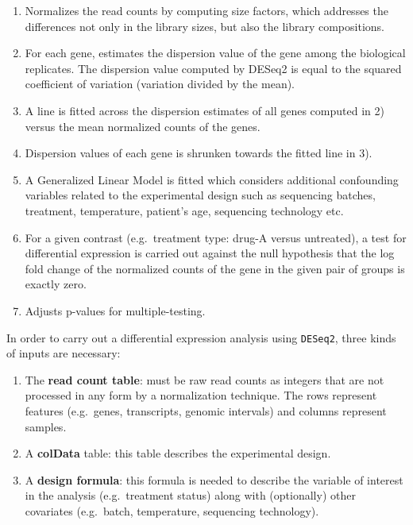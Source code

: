\documentclass[12pt,]{krantz}
\providecommand{\tightlist}{%
  \setlength{\itemsep}{0pt}\setlength{\parskip}{0pt}}
\begin{document}
\begin{enumerate}
\def\labelenumi{\arabic{enumi}.}
\tightlist
\item
  Normalizes the read counts by computing size factors, which addresses the differences not only in the library sizes, but also the library compositions.
\item
  For each gene, estimates the dispersion value of the gene among the biological replicates. The dispersion value computed by DESeq2 is equal to the squared coefficient of variation (variation divided by the mean).\\
\item
  A line is fitted across the dispersion estimates of all genes computed in 2) versus the mean normalized counts of the genes.
\item
  Dispersion values of each gene is shrunken towards the fitted line in 3).
\item
  A Generalized Linear Model is fitted which considers additional confounding variables related to the experimental design such as sequencing batches, treatment, temperature, patient's age, sequencing technology etc.
\item
  For a given contrast (e.g.~treatment type: drug-A versus untreated), a test for differential expression is carried out against the null hypothesis that the log fold change of the normalized counts of the gene in the given pair of groups is exactly zero.
\item
  Adjusts p-values for multiple-testing.
\end{enumerate}

In order to carry out a differential expression analysis using \texttt{DESeq2}, three kinds of inputs are necessary:

\begin{enumerate}
\def\labelenumi{\arabic{enumi}.}
\tightlist
\item
  The \textbf{read count table}: must be raw read counts as integers that are not processed in any form by a normalization technique. The rows represent features (e.g.~genes, transcripts, genomic intervals) and columns represent samples.
\item
  A \textbf{colData} table: this table describes the experimental design.
\item
  A \textbf{design formula}: this formula is needed to describe the variable of interest in the analysis (e.g.~treatment status) along with (optionally) other covariates (e.g.~batch, temperature, sequencing technology).
\end{enumerate}
\end{document}
